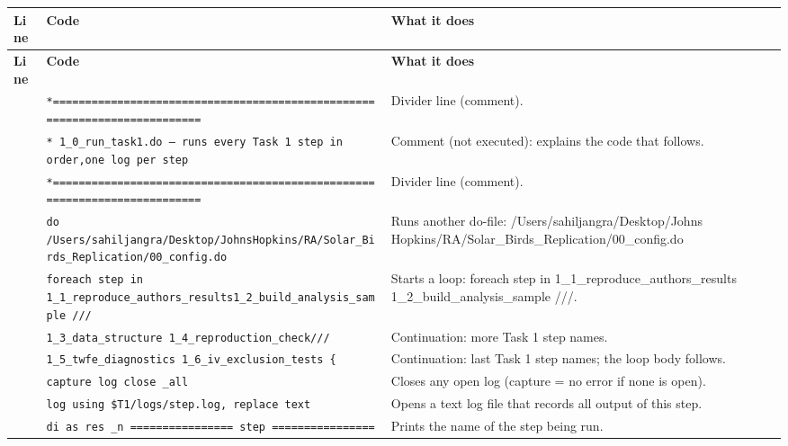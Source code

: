 \documentclass[10pt]{article}
\newcommand{\codetable}[1]{%
{\footnotesize
\begin{longtable}{>{\raggedleft\arraybackslash}p{0.55cm}>{\raggedright\arraybackslash}p{8.3cm}>{\raggedright\arraybackslash}p{8.0cm}}
\toprule \textbf{Line} & \textbf{Code} & \textbf{What it does}\\ \midrule \endfirsthead
\toprule \textbf{Line} & \textbf{Code} & \textbf{What it does}\\ \midrule \endhead
\bottomrule \endfoot
#1
\end{longtable}}}
\begin{document}
\codetable{1 & \texttt{*=========================================================\newline \hspace*{1em}=================} & Divider line (comment).\\
2 & \texttt{* 1\_0\_run\_task1.do  —  runs every Task 1 step in order,\newline \hspace*{1em}one log per step} & Comment (not executed): explains the code that follows.\\
3 & \texttt{*=========================================================\newline \hspace*{1em}=================} & Divider line (comment).\\
4 & \texttt{do \textquotedbl{}/Users/sahiljangra/Desktop/Johns\newline \hspace*{1em}Hopkins/RA/Solar\_Birds\_Replication/00\_config.do\textquotedbl{}} & Runs another do-file: /Users/sahiljangra/Desktop/Johns Hopkins/RA/Solar\_Birds\_Replication/00\_config.do\\
6 & \texttt{foreach step in 1\_1\_reproduce\_authors\_results\newline \hspace*{1em}1\_2\_build\_analysis\_sample ///} & Starts a loop: foreach step in 1\_1\_reproduce\_authors\_results 1\_2\_build\_analysis\_sample ///.\\
7 & \texttt{\hspace*{4.0em}1\_3\_data\_structure 1\_4\_reproduction\_check\newline \hspace*{1em}///} & Continuation: more Task 1 step names.\\
8 & \texttt{\hspace*{4.0em}1\_5\_twfe\_diagnostics 1\_6\_iv\_exclusion\_tests \{} & Continuation: last Task 1 step names; the loop body follows.\\
9 & \texttt{\hspace*{2.0em}capture log close \_all} & Closes any open log (capture = no error if none is open).\\
10 & \texttt{\hspace*{2.0em}log using \textquotedbl{}\$T1/logs/\textasciigrave{}step\textquotesingle{}.log\textquotedbl{}, replace text} & Opens a text log file that records all output of this step.\\
11 & \texttt{\hspace*{2.0em}di as res \_n \textquotedbl{}================ \textasciigrave{}step\textquotesingle{} ================\textquotedbl{}} & Prints the name of the step being run.\\
}
\end{document}
